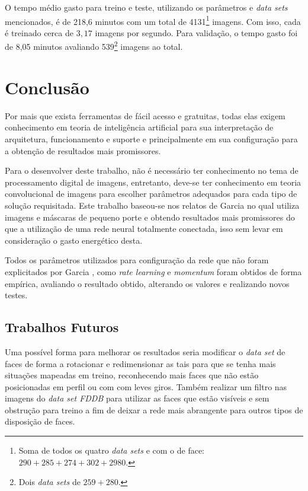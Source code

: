 \documentclass[10pt, conference]{IEEEtran}
\begin{document}
	O tempo médio gasto para treino e teste, utilizando os parâmetros e \textit{data sets} mencionados, é de 218,6 minutos com um total de 4131\footnote{Soma de todos os quatro \textit{data sets} e com o de face: $290 + 285 + 274 + 302 + 2980$.} imagens. Com isso, cada é treinado cerca de $ 3,17 $ imagens por segundo. Para validação, o tempo gasto foi de 8,05 minutos avaliando 539\footnote{Dois \textit{data sets} de $259 + 280$.} imagens ao total.

\section{Conclusão} \label{sec:conclusao}
	Por mais que exista ferramentas de fácil acesso e gratuitas, todas elas exigem conhecimento em teoria de inteligência artificial para sua interpretação de arquitetura, funcionamento e suporte e principalmente em sua configuração para a obtenção de resultados mais promissores.
	
	Para o desenvolver deste trabalho, não é necessário ter conhecimento no tema de processamento digital de imagens, entretanto, deve-se ter conhecimento em teoria convolucional de imagens para escolher parâmetros adequados para cada tipo de solução requisitada. Este trabalho baseou-se nos relatos de Garcia \cite{Garcia2004} no qual utiliza imagens e máscaras de pequeno porte e obtendo resultados mais promissores do que a utilização de uma rede neural totalmente conectada, isso sem levar em consideração o gasto energético desta.
	
	Todos os parâmetros utilizados para configuração da rede que não foram explicitados por Garcia \cite{Garcia2004}, como \textit{rate learning} e \textit{momentum} foram obtidos de forma empírica, avaliando o resultado obtido, alterando os valores e realizando novos testes.

	\subsection{Trabalhos Futuros}
		Uma possível forma para melhorar os resultados seria modificar o \textit{data set} de faces de forma a rotacionar e redimensionar as tais para que se tenha mais situações mapeadas em treino, reconhecendo mais faces que não estão posicionadas em perfil ou com com leves giros. Também realizar um filtro nas imagens do \textit{data set FDDB} para utilizar as faces que estão visíveis e sem obstrução para treino a fim de deixar a rede mais abrangente para outros tipos de disposição de faces.
		
\end{document}
